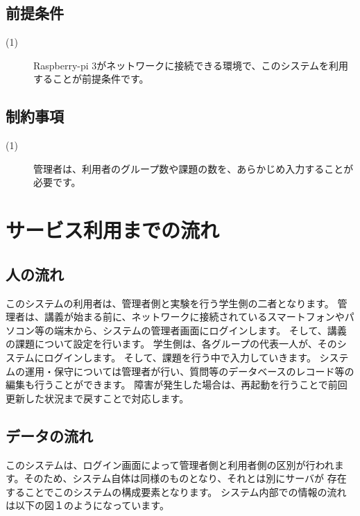 \documentclass[a4j,titlepage]{ujarticle}
\begin{document}
\subsection{前提条件}
\begin{description}
\item[(1)]Raspberry-pi 3がネットワークに接続できる環境で、このシステムを利用することが前提条件です。
\end{description}

\subsection{制約事項}
\begin{description}
\item[(1)]管理者は、利用者のグループ数や課題の数を、あらかじめ入力することが必要です。
\end{description}

\section{サービス利用までの流れ}
\subsection{人の流れ}
このシステムの利用者は、管理者側と実験を行う学生側の二者となります。 %
管理者は、講義が始まる前に、ネットワークに接続されているスマートフォンやパソコン等の端末から、システムの管理者画面にログインします。
そして、講義の課題について設定を行います。
学生側は、各グループの代表一人が、そのシステムにログインします。
そして、課題を行う中で入力していきます。 %
システムの運用・保守については管理者が行い、質問等のデータベースのレコード等の編集も行うことができます。 %
障害が発生した場合は、再起動を行うことで前回更新した状況まで戻すことで対応します。 %


\subsection{データの流れ}
このシステムは、ログイン画面によって管理者側と利用者側の区別が行われます。そのため、システム自体は同様のものとなり、それとは別にサーバが %
存在することでこのシステムの構成要素となります。
システム内部での情報の流れは以下の図１のようになっています。 %
\end{document}
